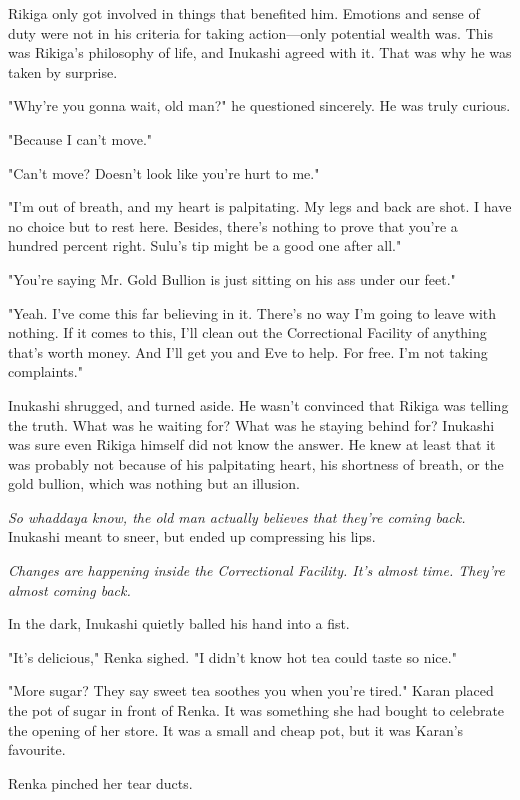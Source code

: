 Rikiga only got involved in things that benefited him. Emotions and
sense of duty were not in his criteria for taking action---only potential
wealth was. This was Rikiga's philosophy of life, and Inukashi agreed
with it. That was why he was taken by surprise.

"Why're you gonna wait, old man?" he questioned sincerely. He was truly
curious.

"Because I can't move."

"Can't move? Doesn't look like you're hurt to me."

"I'm out of breath, and my heart is palpitating. My legs and back are
shot. I have no choice but to rest here. Besides, there's nothing to
prove that you're a hundred percent right. Sulu's tip might be a good
one after all."

"You're saying Mr. Gold Bullion is just sitting on his ass under our
feet."

"Yeah. I've come this far believing in it. There's no way I'm going to
leave with nothing. If it comes to this, I'll clean out the Correctional
Facility of anything that's worth money. And I'll get you and Eve to
help. For free. I'm not taking complaints."

Inukashi shrugged, and turned aside. He wasn't convinced that Rikiga was
telling the truth. What was he waiting for? What was he staying behind
for? Inukashi was sure even Rikiga himself did not know the answer. He
knew at least that it was probably not because of his palpitating heart,
his shortness of breath, or the gold bullion, which was nothing but an
illusion.

\emph{So whaddaya know, the old man actually believes that they're coming
back.} Inukashi meant to sneer, but ended up compressing his lips.

\emph{Changes are happening inside the Correctional Facility. It's almost
time. They're almost coming back.}

In the dark, Inukashi quietly balled his hand into a fist.

\mybreak

"It's delicious," Renka sighed. "I didn't know hot tea could taste so
nice."

"More sugar? They say sweet tea soothes you when you're tired." Karan
placed the pot of sugar in front of Renka. It was something she had
bought to celebrate the opening of her store. It was a small and cheap
pot, but it was Karan's favourite.

Renka pinched her tear ducts.

